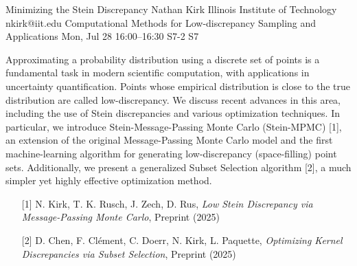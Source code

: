 \begin{talk}
  {Minimizing the Stein Discrepancy}%
  {Nathan Kirk}%
  {Illinois Institute of Technology}%
  {nkirk@iit.edu}%
  {Computational Methods for Low-discrepancy Sampling and Applications}%
  {}%
  {Mon, Jul 28 16:00–16:30}%
  {S7-2}%
  {S7}%
				
			
Approximating a probability distribution using a discrete set of points is a fundamental task in modern scientific computation, with applications in uncertainty quantification. Points whose empirical distribution is close to the true distribution are called low-discrepancy. We discuss recent advances in this area, including the use of Stein discrepancies and various optimization techniques. In particular, we introduce Stein-Message-Passing Monte Carlo (Stein-MPMC) [1], an extension of the original Message-Passing Monte Carlo model and the first machine-learning algorithm for generating low-discrepancy (space-filling) point sets. Additionally, we present a generalized Subset Selection algorithm [2], a much simpler yet highly effective optimization method.

\medskip

\begin{enumerate}
	\item[{[1]}] N. Kirk, T. K. Rusch, J. Zech, D. Rus, \textit{Low Stein Discrepancy via Message-Passing Monte Carlo}, Preprint (2025)
	\item[{[2]}] D. Chen, F. Clément, C. Doerr, N. Kirk, L. Paquette, \textit{Optimizing Kernel Discrepancies via Subset Selection}, Preprint (2025)
\end{enumerate}


\end{talk}

